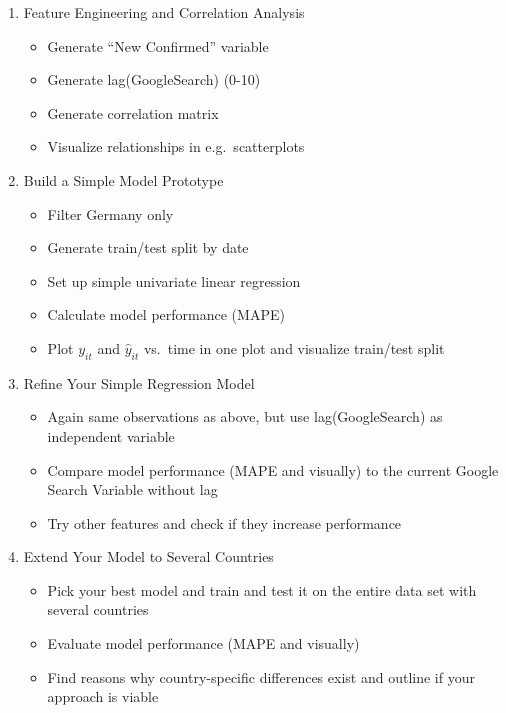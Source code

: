 \documentclass[
  11pt,
]{article}
\providecommand{\tightlist}{%
  \setlength{\itemsep}{0pt}\setlength{\parskip}{0pt}}
\begin{document}
\begin{enumerate}
\def\labelenumi{\arabic{enumi}.}
\tightlist
\item
  Feature Engineering and Correlation Analysis

  \begin{itemize}
  \tightlist
  \item
    Generate ``New Confirmed'' variable
  \item
    Generate lag(GoogleSearch) (0-10)
  \item
    Generate correlation matrix
  \item
    Visualize relationships in e.g.~scatterplots
  \end{itemize}
\item
  Build a Simple Model Prototype

  \begin{itemize}
  \tightlist
  \item
    Filter Germany only
  \item
    Generate train/test split by date
  \item
    Set up simple univariate linear regression
  \item
    Calculate model performance (MAPE)
  \item
    Plot \(y_{it}\) and \(\hat{y}_{it}\) vs.~time in one plot and visualize train/test split
  \end{itemize}
\item
  Refine Your Simple Regression Model

  \begin{itemize}
  \tightlist
  \item
    Again same observations as above, but use lag(GoogleSearch) as independent variable
  \item
    Compare model performance (MAPE and visually) to the current Google Search Variable without lag
  \item
    Try other features and check if they increase performance
  \end{itemize}
\item
  Extend Your Model to Several Countries

  \begin{itemize}
  \tightlist
  \item
    Pick your best model and train and test it on the entire data set with several countries
  \item
    Evaluate model performance (MAPE and visually)
  \item
    Find reasons why country-specific differences exist and outline if your approach is viable
  \end{itemize}
\end{enumerate}
\end{document}
